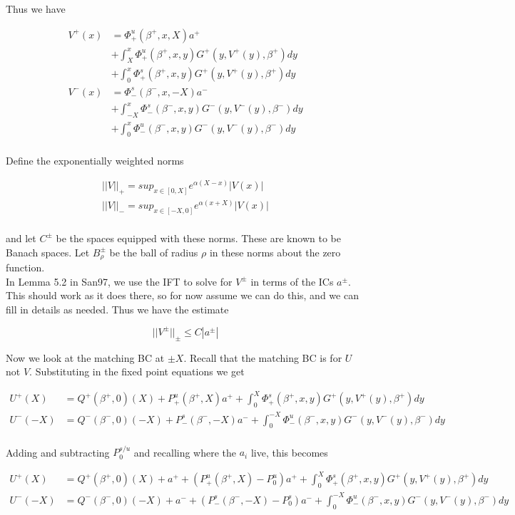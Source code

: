 \documentclass[12pt]{article}
\begin{document}
Thus we have

\begin{align*}
V^+(x) &= \Phi^u_+(\beta^+, x, X) a^+  \\
&+ \int_{X}^x \Phi_+^u(\beta^+, x, y) G^+(y, V^+(y),\beta^+)dy \\
&+ \int_0^x \Phi_+^s(\beta^+, x, y) G^+(y, V^+(y),\beta^+)dy \\ 
V^-(x) &= \Phi^s_-(\beta^-, x, -X) a^-  \\
&+ \int_{-X}^x \Phi_-^s(\beta^-, x, y) G^-(y, V^-(y),\beta^-)dy \\
&+ \int_0^x \Phi_-^u(\beta^-, x, y) G^-(y, V^-(y),\beta^-)dy \\
\end{align*}

Define the exponentially weighted norms

\begin{align*}
||V||_+ = sup_{x \in [0, X]} e^{\alpha(X - x)}|V(x)| \\
||V||_- = sup_{x \in [-X, 0]} e^{\alpha(x + X)}|V(x)| \\
\end{align*}

and let $C^\pm$ be the spaces equipped with these norms. These are known to be Banach spaces. Let $B_\rho^\pm$ be the ball of radius $\rho$ in these norms about the zero function.\\

In Lemma 5.2 in San97, we use the IFT to solve for $V^\pm$ in terms of the ICs $a^\pm$. This should work as it does there, so for now assume we can do this, and we can fill in details as needed. Thus we have the estimate

\[
||V^\pm||_\pm \leq C |a^\pm|
\]

Now we look at the matching BC at $\pm X$. Recall that the matching BC is for $U$ not $V$. Substituting in the fixed point equations we get

\begin{align*}
U^+(X) &= Q^+(\beta^+, 0)(X) + P^u_+(\beta^+, X) a^+ + \int_0^X \Phi_+^s(\beta^+, x, y) G^+(y, V^+(y),\beta^+)dy \\ 
U^-(-X) &= Q^-(\beta^-, 0)(-X) + P^s_-(\beta^-, -X) a^- + \int_0^{-X} \Phi_-^u(\beta^-, x, y) G^-(y, V^-(y),\beta^-)dy \\
\end{align*}

Adding and subtracting $P_0^{s/u}$ and recalling where the $a_i$ live, this becomes

\begin{align*}
U^+(X) &= Q^+(\beta^+, 0)(X) + a^+ + (P^u_+(\beta^+, X) - P^u_0) a^+ + \int_0^X \Phi_+^s(\beta^+, x, y) G^+(y, V^+(y),\beta^+)dy \\ 
U^-(-X) &= Q^-(\beta^-, 0)(-X) + a^- + (P^s_-(\beta^-, -X) - P^s_0) a^- + \int_0^{-X} \Phi_-^u(\beta^-, x, y) G^-(y, V^-(y),\beta^-)dy \\
\end{align*}
\end{document}
